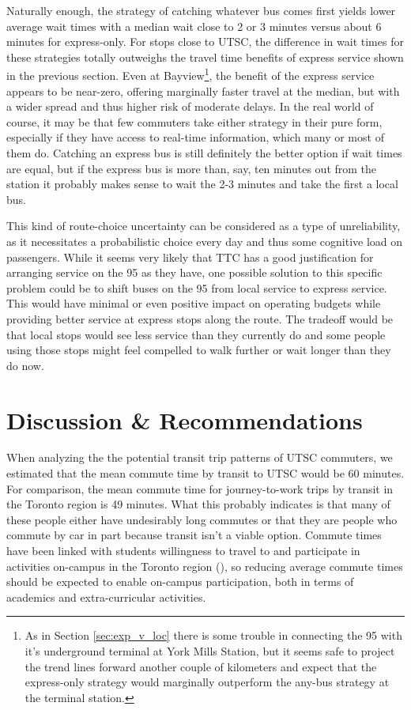 \documentclass{article}
\begin{document}
		Naturally enough, the strategy of catching whatever bus comes first yields lower average wait times with a median wait close to 2 or 3 minutes versus about 6 minutes for express-only. For stops close to UTSC, the difference in wait times for these strategies totally outweighs the travel time benefits of express service shown in the previous section. Even at Bayview\footnote{
			As in Section \ref{sec:exp_v_loc} there is some trouble in connecting the 95 with it's underground terminal at York Mills Station, but it seems safe to project the trend lines forward another couple of kilometers and expect that the express-only strategy would marginally outperform the any-bus strategy at the terminal station. 
		}, the benefit of the express service appears to be near-zero, offering marginally faster travel at the median, but with a wider spread and thus higher risk of moderate delays. 
		In the real world of course, it may be that few commuters take either strategy in their pure form, especially if they have access to real-time information, which many or most of them do. 
		Catching an express bus is still definitely the better option if wait times are equal, but if the express bus is more than, say, ten minutes out from the station it probably makes sense to wait the 2-3 minutes and take the first a local bus. 
		
		This kind of route-choice uncertainty can be considered as a type of unreliability, as it necessitates a probabilistic choice every day and thus some cognitive load on passengers. 
		While it seems very likely that TTC has a good justification for arranging service on the 95 as they have, one possible solution to this specific problem could be to shift buses on the 95 from local service to express service. This would have minimal or even positive impact on operating budgets while providing better service at express stops along the route. The tradeoff would be that local stops would see less service than they currently do and some people using those stops might feel compelled to walk further or wait longer than they do now. 
		

\section{Discussion \& Recommendations}

	When analyzing the the potential transit trip patterns of UTSC commuters, we estimated that the mean commute time by transit to UTSC would be 60 minutes. For comparison, the mean commute time for journey-to-work trips by transit in the Toronto region is 49 minutes. What this probably indicates is that many of these people either have undesirably long commutes or that they are people who commute by car in part because transit isn't a viable option. 
	Commute times have been linked with students willingness to travel to and participate in activities on-campus in the Toronto region (\cite{allen2018}), so reducing average commute times should be expected to enable on-campus participation, both in terms of academics and extra-curricular activities.
\end{document}
